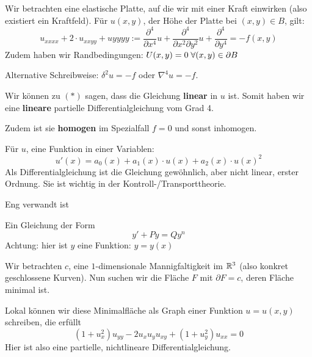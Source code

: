 \documentclass[main.tex]{subfiles}
\begin{document}
\begin{Beispiel}
  Wir betrachten eine elastische Platte, auf die wir mit einer Kraft einwirken (also existiert ein Kraftfeld).
  Für $u(x,y)$, der Höhe der Platte bei $(x,y) \in B$, gilt:
  \begin{equation*}
    u_{xxxx} + 2 \cdot u_{xxyy} + u{yyyy} := \dfrac{\partial^4}{\partial x^4} u + \dfrac{\partial^4}{\partial x^2 \partial y^2} u + \dfrac{\partial^4}{\partial y^4}= -f(x,y) \tag{*}
  \end{equation*}
  Zudem haben wir Randbedingungen: $U(x,y) = 0 \;\forall (x,y) \in \partial B$

  Alternative Schreibweise: $\delta^2 u = -f$ oder $\nabla^4 u = -f$.

  Wir können zu $(*)$ sagen, dass die Gleichung \textbf{linear} in $u$ ist. Somit haben wir eine \textbf{lineare} partielle Differentialgleichung vom Grad 4.

  Zudem ist sie \textbf{homogen} im Spezialfall $f = 0$ und sonst inhomogen.
\end{Beispiel}

\begin{Beispiel}
  Für $u$, eine Funktion in einer Variablen:
  $$u'(x) = a_0(x) + a_1(x) \cdot u(x) + a_2(x) \cdot u(x)^2$$
  Als Differentialgleichung ist die Gleichung gewöhnlich, aber nicht linear, erster Ordnung.
  Sie ist wichtig in der Kontroll-/Transporttheorie.
\end{Beispiel}
Eng verwandt ist

\begin{Beispiel}
  Ein Gleichung der Form
  $$y' + Py = Qy^n$$
  Achtung: hier ist $y$ eine Funktion: $y = y(x)$
\end{Beispiel}

\begin{Beispiel}
  Wir betrachten $c$, eine $1$-dimensionale Mannigfaltigkeit im $\mathbb{R}^3$ (also konkret geschlossene Kurven). Nun suchen wir die Fläche $F$ mit $\partial F = c$, deren Fläche minimal ist.

  Lokal können wir diese Minimalfläche als Graph einer Funktion $u = u(x,y)$ schreiben, die erfüllt
  $$(1 + u_x^2) u_{yy} - 2u_x u_y u_{xy} + (1+u_y^2)u_{xx} = 0$$
  Hier ist also eine partielle, nichtlineare Differentialgleichung.
\end{Beispiel}
\end{document}

